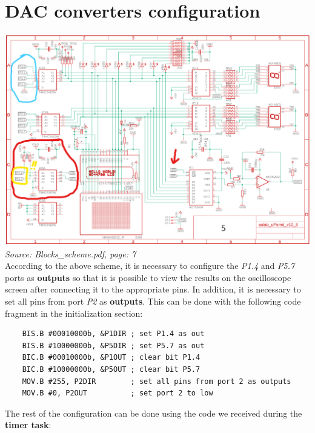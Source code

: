\documentclass{article}
\begin{document}
\section{DAC converters configuration}
\includegraphics[width=\textwidth]{"../img/Blocks_scheme_7.png"}
\textit{Source: Blocks\_scheme.pdf, page: 7}
\vspace{3mm} \\
According to the above scheme, it is necessary to configure the \textit{P1.4} and \textit{P5.7} ports as \textbf{outputs} so that it is possible to view the results on the oscilloscope screen after connecting it to the appropriate pins.
In addition, it is necessary to set all pins from port \textit{P2} as \textbf{outputs}.
This can be done with the following code fragment in the initialization section:
\begin{verbatim}
    BIS.B #00010000b, &P1DIR ; set P1.4 as out
    BIS.B #10000000b, &P5DIR ; set P5.7 as out
    BIC.B #00010000b, &P1OUT ; clear bit P1.4
    BIC.B #10000000b, &P5OUT ; clear bit P5.7
    MOV.B #255, P2DIR        ; set all pins from port 2 as outputs
    MOV.B #0, P2OUT          ; set port 2 to low \end{verbatim}
The rest of the configuration can be done using the code we received during the \textbf{timer task}:
\newpage
\end{document}
